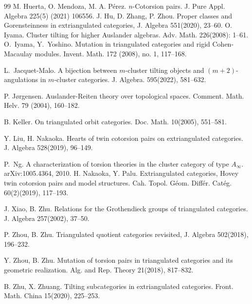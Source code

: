 \documentclass[a4paper,reqno,11pt]{amsart}
\theoremstyle{definition}
\begin{document}
\begin{thebibliography}{99}
 M. Huerta, O. Mendoza, M. A. P\'{e}rez. $n$-Cotorsion pairs. J. Pure Appl. Algebra 225(5) (2021) 106556.
%
 J. Hu, D. Zhang, P. Zhou. Proper classes and Gorensteinness in extriangulated categories, J. Algebra 551(2020), 23--60.
%
 O. Iyama. Cluster tilting for higher Auslander algebras. Adv. Math. 226(2008): 1--61.
%
 O.~Iyama, Y.~Yoshino. Mutation in triangulated categories and rigid Cohen-Macaulay modules. Invent. Math. 172 (2008), no. 1, 117--168.

 L.~Jacquet-Malo. A bijection between $m$-cluster tilting objects and $(m+2)$-angulations in $m$-cluster categories. J. Algebra. 595(2022), 581--632.

 P. J{\o}rgensen. Auslander-Reiten theory over topological spaces. Comment. Math. Helv. 79 (2004),
160--182.



 B. Keller. On triangulated orbit categories. Doc. Math. 10(2005), 551--581.

 Y. Liu, H. Nakaoka. Hearts of twin cotorsion pairs on extriangulated categories. J. Algebra
528(2019), 96--149.

 P.~Ng. A characterization of torsion theories in the cluster category of type $A_\infty$. arXiv:1005.4364, 2010.
%
 H. Nakaoka, Y. Palu.  Extriangulated categories, Hovey twin cotorsion pairs and
model structures. Cah. Topol. G\'{e}om. Diff\'{e}r. Cat\'{e}g. 60(2)(2019), 117--193.


 J. Xiao, B. Zhu.
Relations for the Grothendieck groups of triangulated categories. J. Algebra 257(2002), 37--50.


 P. Zhou, B. Zhu. Triangulated quotient categories revisited, J. Algebra 502(2018), 196--232.

 Y. Zhou, B. Zhu. Mutation of torsion pairs in triangulated categories and its geometric realization.
Alg. and Rep. Theory 21(2018), 817--832.

 B. Zhu, X. Zhuang. Tilting subcategories in extriangulated categories. Front. Math. China 15(2020), 225--253.

\end{thebibliography}
\end{document}
